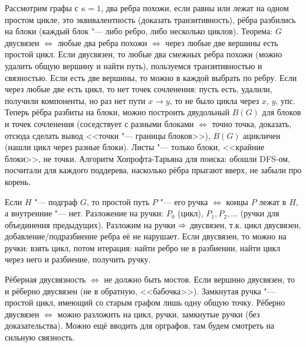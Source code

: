 	Рассмотрим графы с $\kappa=1$, два ребра похожи, если равны или лежат на одном простом цикле,
	это эквивалентность (доказать транзитивность), рёбра разбились на блоки (каждый блок "--- либо ребро, либо несколько циклов).
	Теорема: $G$ двусвязен $\iff$ любые два ребра похожи $\iff$ через любые две вершины есть простой цикл.
	Если двусвязен, то любые два смежных ребра похожи (можно удалить общую вершину и найти путь), пользуемся транзитивностью и связностью.
	Если есть две вершины, то можно в каждой выбрать по ребру.
	Если через любые две есть цикл, то нет точек сочленения: пусть есть, удалили,
	получили компоненты, но раз нет пути $x \to y$, то не было цикла через $x$, $y$, упс.
	Теперь рёбра разбиты на блоки, можно построить двудольный $B(G)$ для блоков и точек сочленения (соседствует с разными блоками $\iff$ точно точка, доказать,
	отсюда сделать вывод <<точки "--- границы блоков>>), $B(G)$ ацикличен (нашли цикл через разные блоки).
	Листы "--- только блоки, <<крайние блоки>>, не точки.
	Алгоритм Хопрофта-Тарьяна для поиска: обошли DFS-ом, посчитали для каждого поддерева, насколько рёбра прыгают вверх, не забыли про корень.

	Если $H$ "--- подграф $G$, то простой путь $P$ "--- его ручка $\iff$ концы $P$ лежат в $H$, а внутренние "--- нет.
	Разложение на ручки: $P_0$ (цикл), $P_1, P_2, \dots$ (ручки для объединения предыдущих).
	Разложим на ручки $\Rightarrow$ двусвязен, т.к. цикл двусвязен, добавление/подразбиение ребра её не нарушает.
	Если двусвязен, то можно на ручки: взять цикл, потом итерация: найти ребро не в разбиении, найти цикл через него и разбиение, получить ручку.

	Рёберная двусвязность $\iff$ не должно быть мостов.
	Если вершнно двусвязен, то и рёберно двусвязен (не в обратную, <<бабочка>>).
	Замкнутая ручка "--- простой цикл, имеющий со старым графом лишь одну общую точку.
	Рёберно двусвязен $\iff$ можно разложить на цикл, ручки, замкнутые ручки (без доказательства).
	Можно ещё вводить для орграфов, там будем смотреть на сильную связность.
